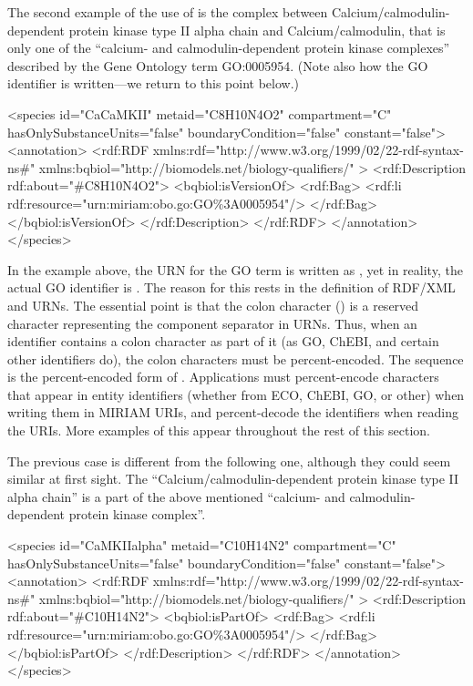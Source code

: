 The second example of the use of  is the
complex between Calcium/calmodulin-dependent protein kinase type
II alpha chain and Calcium/calmodulin, that is only one of the
``calcium- and calmodulin-dependent protein kinase complexes''
described by the Gene Ontology term GO:0005954.  (Note also how
the GO identifier is written---we return to this point below.)

\begin{example}
<species id="CaCaMKII" metaid="C8H10N4O2" compartment="C"
         hasOnlySubstanceUnits="false" boundaryCondition="false"
         constant="false">
  <annotation>
    <rdf:RDF
      xmlns:rdf="http://www.w3.org/1999/02/22-rdf-syntax-ns\#"
      xmlns:bqbiol="http://biomodels.net/biology-qualifiers/"
    >
      <rdf:Description rdf:about="\#C8H10N4O2">
        <bqbiol:isVersionOf>
          <rdf:Bag>
            <rdf:li rdf:resource="urn:miriam:obo.go:GO\%3A0005954"/>
          </rdf:Bag>
        </bqbiol:isVersionOf>
      </rdf:Description>
    </rdf:RDF>
  </annotation>
</species>
\end{example}

In the example above, the URN for the GO term is written as
, yet in reality, the actual GO identifier is
.  The reason for this rests in the definition
of RDF/XML and URNs.  The essential point is that the colon
character (\val{:}) is a reserved character representing the
component separator in URNs.  Thus, when an identifier contains a
colon character as part of it (as GO, ChEBI, and certain other
identifiers do), the colon characters must be percent-encoded.
The sequence  is the percent-encoded form of \val{:}.
Applications must percent-encode \val{:} characters that appear in
entity identifiers (whether from ECO, ChEBI, GO, or other) when
writing them in MIRIAM URIs, and percent-decode the identifiers
when reading the URIs.  More examples of this appear throughout
the rest of this section.

The previous case is different from the following one, although they
could seem similar at first sight. The
``Calcium/calmodulin-dependent protein kinase type II alpha
chain'' is a part of the above mentioned ``calcium- and
calmodulin-dependent protein kinase complex''.

\begin{example}
<species id="CaMKIIalpha" metaid="C10H14N2" compartment="C"
         hasOnlySubstanceUnits="false" boundaryCondition="false"
         constant="false">
  <annotation>
    <rdf:RDF
      xmlns:rdf="http://www.w3.org/1999/02/22-rdf-syntax-ns\#"
      xmlns:bqbiol="http://biomodels.net/biology-qualifiers/"
    >
      <rdf:Description rdf:about="\#C10H14N2">
        <bqbiol:isPartOf>
          <rdf:Bag>
            <rdf:li rdf:resource="urn:miriam:obo.go:GO\%3A0005954"/>
          </rdf:Bag>
        </bqbiol:isPartOf>
      </rdf:Description>
    </rdf:RDF>
  </annotation>
</species>
\end{example}

